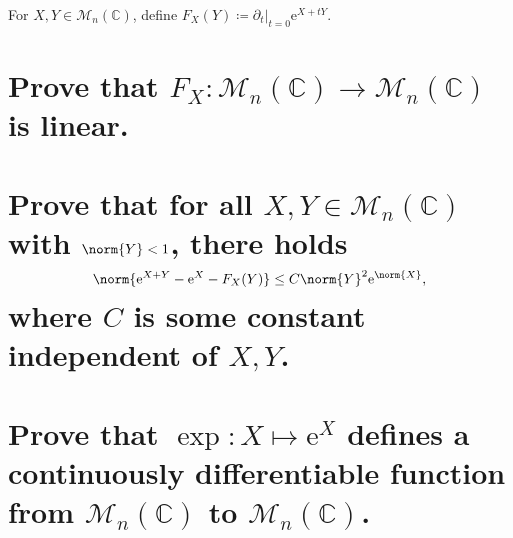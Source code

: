 \documentclass[pages,boxes,color=WildStrawberry]{homework}
\newcommand{\C}{\mathbb{C}}
\newcommand{\1}{\mathbb{1}}
\newcommand{\e}{\mathrm{e}}
\newcommand{\mats}[2]{\mathcal{M}_{#1}(#2)}
\begin{document}
\begin{problem}
For $X, Y\in\mats{n}{\C}$, define $F_X(Y)\coloneqq\partial_t|_{t=0}\e^{X + tY}$.
\begin{parts}
	\part{Prove that $F_X:\mats{n}{\C}\to\mats{n}{\C}$ is linear.}\label{part:7a}
	\part{Prove that for all $X, Y\in\mats{n}{\C}$ with $\norm{Y} < 1$, there holds \[\norm{\e^{X + Y} - \e^X - F_X(Y)}\leq C\norm{Y}^2\e^{\norm{X}},\] where $C$ is some constant independent of $X, Y$.}\label{part:7b}
	\part{Prove that $\exp:X\mapsto\e^X$ defines a continuously differentiable function from $\mats{n}{\C}$ to $\mats{n}{\C}$.}\label{part:7c}
\end{parts}
\end{problem}
\end{document}
